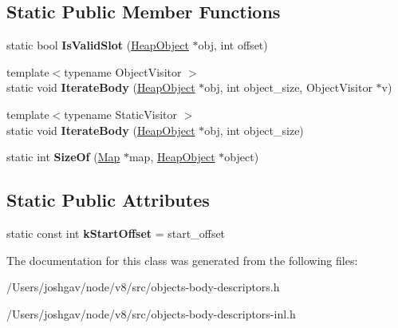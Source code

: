 \subsection*{Static Public Member Functions}
\begin{DoxyCompactItemize}
\item 
static bool {\bfseries Is\+Valid\+Slot} (\hyperlink{classv8_1_1internal_1_1_heap_object}{Heap\+Object} $\ast$obj, int offset)\hypertarget{classv8_1_1internal_1_1_flexible_body_descriptor_aa79334702051f136b40c5a331417b06a}{}\label{classv8_1_1internal_1_1_flexible_body_descriptor_aa79334702051f136b40c5a331417b06a}

\item 
{\footnotesize template$<$typename Object\+Visitor $>$ }\\static void {\bfseries Iterate\+Body} (\hyperlink{classv8_1_1internal_1_1_heap_object}{Heap\+Object} $\ast$obj, int object\+\_\+size, Object\+Visitor $\ast$v)\hypertarget{classv8_1_1internal_1_1_flexible_body_descriptor_a831bf0cf1324444e039dcd7b7f2f4faf}{}\label{classv8_1_1internal_1_1_flexible_body_descriptor_a831bf0cf1324444e039dcd7b7f2f4faf}

\item 
{\footnotesize template$<$typename Static\+Visitor $>$ }\\static void {\bfseries Iterate\+Body} (\hyperlink{classv8_1_1internal_1_1_heap_object}{Heap\+Object} $\ast$obj, int object\+\_\+size)\hypertarget{classv8_1_1internal_1_1_flexible_body_descriptor_a3b1c7942fbed459c907d8a72c40c3e9b}{}\label{classv8_1_1internal_1_1_flexible_body_descriptor_a3b1c7942fbed459c907d8a72c40c3e9b}

\item 
static int {\bfseries Size\+Of} (\hyperlink{classv8_1_1internal_1_1_map}{Map} $\ast$map, \hyperlink{classv8_1_1internal_1_1_heap_object}{Heap\+Object} $\ast$object)\hypertarget{classv8_1_1internal_1_1_flexible_body_descriptor_abb010bfde8d4ccf81dd18e60dec949af}{}\label{classv8_1_1internal_1_1_flexible_body_descriptor_abb010bfde8d4ccf81dd18e60dec949af}

\end{DoxyCompactItemize}
\subsection*{Static Public Attributes}
\begin{DoxyCompactItemize}
\item 
static const int {\bfseries k\+Start\+Offset} = start\+\_\+offset\hypertarget{classv8_1_1internal_1_1_flexible_body_descriptor_a27ad85d165e2d35360cf5150db132825}{}\label{classv8_1_1internal_1_1_flexible_body_descriptor_a27ad85d165e2d35360cf5150db132825}

\end{DoxyCompactItemize}


The documentation for this class was generated from the following files\+:\begin{DoxyCompactItemize}
\item 
/\+Users/joshgav/node/v8/src/objects-\/body-\/descriptors.\+h\item 
/\+Users/joshgav/node/v8/src/objects-\/body-\/descriptors-\/inl.\+h\end{DoxyCompactItemize}
